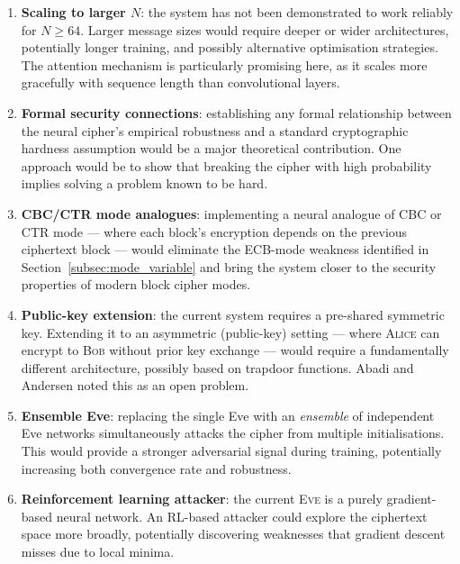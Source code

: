 \documentclass[12pt, a4paper]{article}
\newcommand{\alice}{\textsc{Alice}}
\newcommand{\bob}{\textsc{Bob}}
\newcommand{\eve}{\textsc{Eve}}
\begin{document}
\begin{enumerate}[leftmargin=2em, itemsep=6pt]

  \item \textbf{Scaling to larger $N$}: the system has not been
        demonstrated to work reliably for $N \geq 64$. Larger message
        sizes would require deeper or wider architectures, potentially
        longer training, and possibly alternative optimisation strategies.
        The attention mechanism is particularly promising here, as it
        scales more gracefully with sequence length than convolutional
        layers.

  \item \textbf{Formal security connections}: establishing any formal
        relationship between the neural cipher's empirical robustness
        and a standard cryptographic hardness assumption would be a
        major theoretical contribution. One approach would be to show
        that breaking the cipher with high probability implies solving
        a problem known to be hard.

  \item \textbf{CBC/CTR mode analogues}: implementing a neural analogue
        of CBC or CTR mode --- where each block's encryption depends on
        the previous ciphertext block --- would eliminate the ECB-mode
        weakness identified in Section~\ref{subsec:mode_variable} and bring the system closer
        to the security properties of modern block cipher modes.

  \item \textbf{Public-key extension}: the current system requires a
        pre-shared symmetric key. Extending it to an asymmetric
        (public-key) setting --- where \alice{} can encrypt to \bob{}
        without prior key exchange --- would require a fundamentally
        different architecture, possibly based on trapdoor functions.
        Abadi and Andersen noted this as an open problem.

  \item \textbf{Ensemble Eve}: replacing the single Eve with an
        \emph{ensemble} of independent Eve networks simultaneously
        attacks the cipher from multiple initialisations. This would
        provide a stronger adversarial signal during training, potentially
        increasing both convergence rate and robustness.

  \item \textbf{Reinforcement learning attacker}: the current \eve{} is
        a purely gradient-based neural network. An RL-based attacker
        could explore the ciphertext space more broadly, potentially
        discovering weaknesses that gradient descent misses due to
        local minima.

\end{enumerate}
\end{document}
